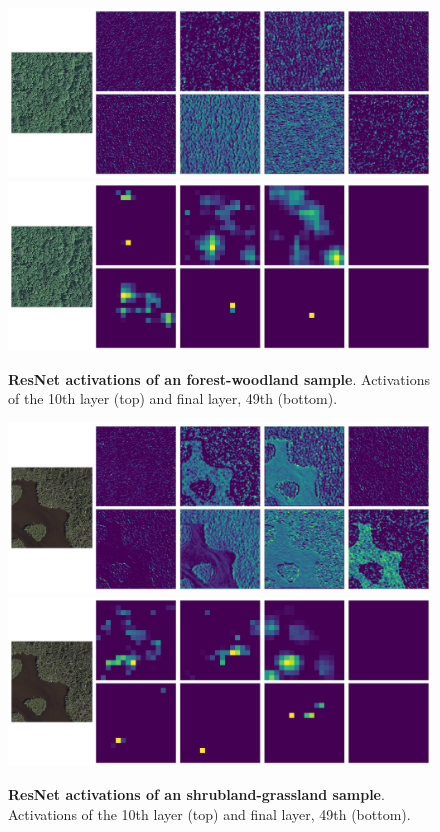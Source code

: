 \begin{figure}[h!]
	\centering
	\captionsetup{width=1\linewidth}
	\includegraphics[width=1\textwidth]{Figures/activations/forest-woodland_l0_s1_activation_10.png}
	\includegraphics[width=1\textwidth]{Figures/activations/forest-woodland_l0_s1_activation_49.png}
	\caption{\textbf{ResNet activations of an forest-woodland sample}. Activations of the 10th layer (top) and final layer, 49th (bottom).}
	\label{fig:degrade}
\end{figure}

\begin{figure}[h!]
	\centering
	\captionsetup{width=1\linewidth}
	\includegraphics[width=1\textwidth]{Figures/activations/shrubland-grassland_l0_s1_activation_10.png}
	\includegraphics[width=1\textwidth]{Figures/activations/shrubland-grassland_l0_s1_activation_49.png}
	\caption{\textbf{ResNet activations of an shrubland-grassland sample}. Activations of the 10th layer (top) and final layer, 49th (bottom).}
	\label{fig:degrade}
\end{figure}


